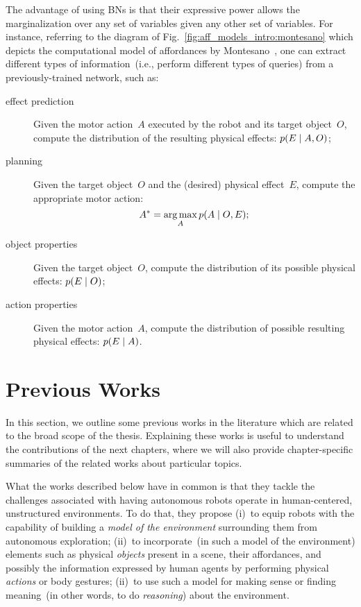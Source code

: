 The advantage of using \acp{BN} is that their expressive power allows the marginalization over any set of variables given any other set of variables.
For instance, referring to the diagram of Fig.~\ref{fig:aff_models_intro:montesano} which depicts the computational model of affordances by Montesano~\cite{montesano:2008}, one can extract different types of information~(i.e., perform different types of queries) from a previously-trained network, such as:
\begin{description}
\item[effect prediction] Given the motor action~$A$ executed by the robot and its target object~$O$, compute the distribution of the resulting physical effects: $p(E \mid A,O)$;

\item[planning] Given the target object~$O$ and the (desired) physical effect~$E$, compute the appropriate motor action:
    \begin{equation*}
      A^{*} = \operatorname*{arg\,max}_{A} p(A \mid O,E);
    \end{equation*}

\item[object properties] Given the target object~$O$, compute the distribution of its possible physical effects: $p(E \mid O)$;

\item[action properties] Given the motor action~$A$, compute the distribution of possible resulting physical effects: $p(E \mid A)$.
\end{description}

\section{Previous Works}
\label{sec:background:previous_works}

In this section, we outline some previous works in the literature which are related to the broad scope of the thesis.
Explaining these works is useful to understand the contributions of the next chapters, where we will also provide chapter-specific summaries of the related works about particular topics.

What the works described below have in common is that they tackle the challenges associated with having autonomous robots operate in human-centered, unstructured environments.
To do that, they propose
(i)~to equip robots with the capability of building a \emph{model of the environment} surrounding them from autonomous exploration;
(ii)~to incorporate~(in such a model of the environment) elements such as physical \emph{objects} present in a scene, their affordances, and possibly the information expressed by human agents by performing physical \emph{actions} or body gestures;
(ii)~to use such a model for making sense or finding meaning~(in other words, to do \emph{reasoning}) about the environment.

